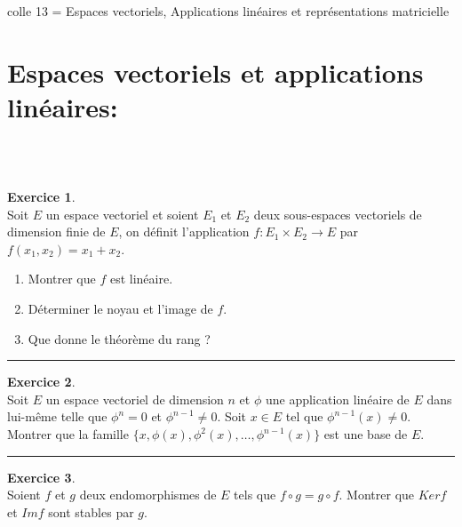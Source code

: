 \documentclass[a4paper,10pt]{article}
\theoremstyle{definition}
\theoremstyle{definition}
\newtheorem{exo}{Exercice}
\begin{document}
	
	
	\begin{center}
		\Large \sc colle 13 = Espaces vectoriels, Applications linéaires et représentations matricielle
	\end{center}




\section*{Espaces vectoriels et applications linéaires:}\hfill\\\hfill\\
\begin{minipage}{1\linewidth}
	\begin{minipage}[t]{0.48\linewidth}
		\raggedright
		
		
		
		\begin{exo}\quad\\
			Soit $E$ un espace vectoriel et soient $E_1$ et $E_2$ deux sous-espaces vectoriels de dimension finie
			de $E$, on d\'efinit l'application $f\colon E_1\times E_2 \to E$ par $f(x_1,x_2)=x_1+x_2$.
			\begin{enumerate}
				\item Montrer que $f$ est lin\'eaire.
				\item D\'eterminer le noyau et l'image de $f$.
				\item Que donne le th\'eor\`eme du rang ?
			\end{enumerate}
			
			\centering
			\rule{1\linewidth}{0.6pt}
		\end{exo}
	
		\begin{exo}\quad\\
		Soit $E$ un espace vectoriel de dimension $n$ et
		$\phi $  une application lin\'eaire de  $E$  dans lui-m\^eme telle que  $\phi ^n=0$  et
		$\phi ^{n-1}\not = 0$.
		Soit  $x\in E$  tel que  $\phi ^{n-1}(x )\not = 0$. Montrer que la
		famille  $\{ x,\phi(x),\phi^2(x), \ldots ,\phi ^{n-1}(x)\} $  est une base de $E$.
			
		\centering
		\rule{1\linewidth}{0.6pt}
	\end{exo}


		\begin{exo}\quad\\
		Soient $f$ et $g$ deux endomorphismes de $E$ tels que $f \circ g = g \circ f$.
		Montrer que $Ker f$ et $Im f$ sont stables par $g$.
		

\end{exo}
\end{minipage}
\end{minipage}
\end{document}
